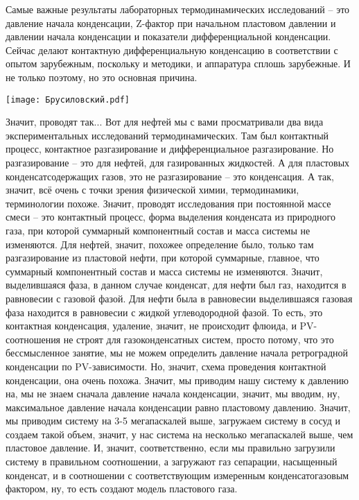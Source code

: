 \documentclass[main.tex]{subfiles}
\begin{document}
Самые важные результаты лабораторных термодинамических исследований -- это давление начала конденсации, Z-фактор при начальном пластовом давлении и давлении начала конденсации и показатели дифференциальной конденсации.
Сейчас делают контактную дифференциальную конденсацию в соответствии с опытом зарубежным, поскольку и методики, и аппаратура сплошь зарубежные.
И не только поэтому, но это основная причина.

\begin{center}
\texttt{[image: Брусиловский.pdf]}
\end{center}

Значит, проводят так...
Вот для нефтей мы с вами просматривали два вида экспериментальных исследований термодинамических.
Там был контактный процесс, контактное разгазирование и дифференциальное разгазирование.
Но разгазирование -- это для нефтей, для газированных жидкостей.
А для пластовых конденсатсодержащих газов, это не разгазирование -- это конденсация.
А так, значит, всё очень с точки зрения физической химии, термодинамики, терминологии похоже.
Значит, проводят исследования при постоянной массе смеси -- это контактный процесс, форма выделения конденсата из природного газа, при которой суммарный компонентный состав и масса системы не изменяются.
Для нефтей, значит, похожее определение было, только там разгазирование из пластовой нефти, при которой суммарные, главное, что суммарный компонентный состав и масса системы не изменяются.
Значит, выделившаяся фаза, в данном случае конденсат, для нефти был газ, находится в равновесии с газовой фазой.
Для нефти была в равновесии выделившаяся газовая фаза находится в равновесии с жидкой углеводородной фазой.
То есть, это контактная конденсация, удаление, значит, не происходит флюида, и PV-соотношения не строят для газоконденсатных систем, просто потому, что это бессмысленное занятие, мы не можем определить давление начала ретроградной конденсации по PV-зависимости.
Но, значит, схема проведения контактной конденсации, она очень похожа.
Значит, мы приводим нашу систему к давлению на, мы не знаем сначала давление начала конденсации, значит, мы вводим, ну, максимальное давление начала конденсации равно пластовому давлению.
Значит, мы приводим систему на 3-5 мегапаскалей выше, загружаем систему в сосуд и создаем такой объем, значит, у нас система на несколько мегапаскалей выше, чем пластовое давление.
И, значит, соответственно, если мы правильно загрузили систему в правильном соотношении, а загружают газ сепарации, насыщенный конденсат, и в соотношении с соответствующим измеренным конденсатогазовым фактором, ну, то есть создают модель пластового газа.
\end{document}
